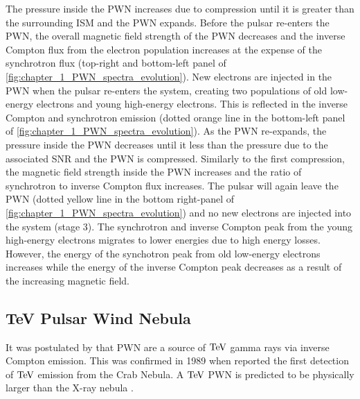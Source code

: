 \newpar
The pressure inside the PWN increases due to compression until it is greater than the surrounding ISM and the PWN expands. Before the pulsar re-enters the PWN, the overall magnetic field strength of the PWN decreases and the inverse Compton flux from the electron population increases at the expense of the synchrotron flux (top-right and bottom-left panel of \autoref{fig:chapter_1_PWN_spectra_evolution}). New electrons are injected in the PWN when the pulsar re-enters the system, creating two populations of old low-energy electrons and young high-energy electrons. This is reflected in the inverse Compton and synchrotron emission (dotted orange line in the bottom-left panel of \autoref{fig:chapter_1_PWN_spectra_evolution}).
\newpar
As the PWN re-expands, the pressure inside the PWN decreases until it less than the pressure due to the associated SNR and the PWN is compressed. Similarly to the first compression, the magnetic field strength inside the PWN increases and the ratio of synchrotron to inverse Compton flux increases. The pulsar will again leave the PWN (dotted yellow line in the bottom right-panel of \autoref{fig:chapter_1_PWN_spectra_evolution}) and no new electrons are injected into the system (stage 3). The synchrotron and inverse Compton peak from the young high-energy electrons migrates to lower energies due to high energy losses. However, the energy of the synchotron peak from old low-energy electrons increases while the energy of the inverse Compton peak decreases as a result of the increasing magnetic field.

\subsection{TeV Pulsar Wind Nebula} \label{sec:01_PWN_TeVPWN}

It was postulated by \cite{1965PhRvL..15..577G} that PWN are a source of $\TeV$ gamma rays via inverse Compton emission. This was confirmed in 1989 when \cite{1989ApJ...342..379W} reported the first detection of $\TeV$ emission from the Crab Nebula. A $\TeV$ PWN is predicted to be physically larger than the X-ray nebula \citep{1997MNRAS.291..162A}.

